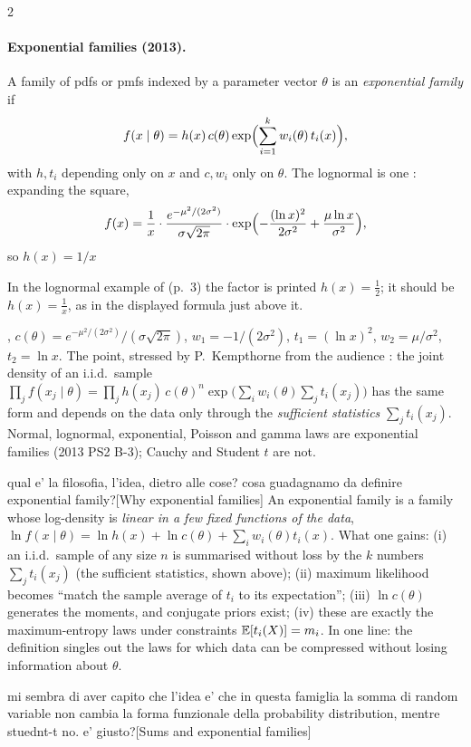 \begin{paracol}{2}
\paragraph{Exponential families (2013).} A family of pdfs or pmfs indexed by a parameter vector $\theta$ is an
\emph{exponential family} if 
\[
  f(x\mid\theta)=h(x)\,c(\theta)\exp\Bigl(\sum_{i=1}^kw_i(\theta)\,t_i(x)\Bigr),
\]
with $h,t_i$ depending only on $x$ and $c,w_i$ only on $\theta$. The lognormal is one :
expanding the square,
\[
  f(x)=\frac1x\cdot\frac{e^{-\mu^2/(2\sigma^2)}}{\sigma\sqrt{2\pi}}\cdot\exp\Bigl(-\frac{(\ln x)^2}{2\sigma^2}+\frac{\mu\ln x}{\sigma^2}\Bigr),
\]
so $h(x)=1/x$\begin{coursenote}
In the lognormal example of  (p.~3) the factor is printed $h(x)=\frac12$; it should be
$h(x)=\frac1x$, as in the displayed formula just above it.
\end{coursenote}, $c(\theta)=e^{-\mu^2/(2\sigma^2)}/(\sigma\sqrt{2\pi})$, $w_1=-1/(2\sigma^2)$, $t_1=(\ln x)^2$, $w_2=\mu/\sigma^2$,
$t_2=\ln x$. The point, stressed by P.~Kempthorne from the audience : the joint density of an
i.i.d.\ sample $\prod_jf(x_j\mid\theta)=\prod_jh(x_j)\,c(\theta)^n\exp\bigl(\sum_iw_i(\theta)\sum_jt_i(x_j)\bigr)$ has the
same form and depends on the data only through the \emph{sufficient statistics} $\sum_jt_i(x_j)$. Normal,
lognormal, exponential, Poisson and gamma laws are exponential families (2013 PS2 B-3); Cauchy and Student $t$
are not.\begin{answer}{qual e' la filosofia, l'idea, dietro alle cose? cosa guadagnamo da definire exponential family?}[Why exponential families]
An exponential family is a family whose log-density is \emph{linear in a few fixed functions of the data},
$\ln f(x\mid\theta)=\ln h(x)+\ln c(\theta)+\sum_iw_i(\theta)t_i(x)$. What one gains: (i) an i.i.d.\ sample of any size $n$ is
summarised without loss by the $k$ numbers $\sum_jt_i(x_j)$ (the sufficient statistics, shown above); (ii) maximum
likelihood becomes ``match the sample average of $t_i$ to its expectation''; (iii) $\ln c(\theta)$ generates the moments, and
conjugate priors exist; (iv) these are exactly the maximum-entropy laws under constraints $\mathbb{E}[t_i(X)]=m_i$. In one line: the
definition singles out the laws for which data can be compressed without losing information about $\theta$.
\end{answer}
\begin{answer}{mi sembra di aver capito che l'idea e' che in questa famiglia la somma di random variable non cambia la forma funzionale della probability distribution, mentre stuednt-t no. e' giusto?}[Sums and exponential families]

\end{answer}
\end{paracol}
